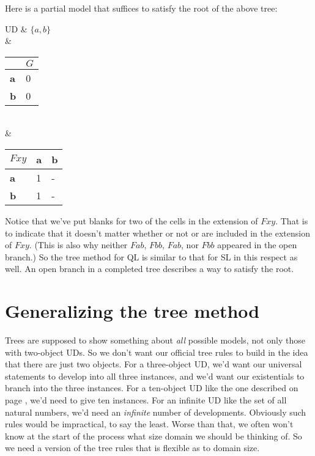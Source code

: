 Here is a partial model that suffices to satisfy the root of the above tree:

\begin{partialmodel}
	UD & $\{a, b\}$\\
	 & \begin{tabular}{l|l}
	           & $G$ \\ \hline
		\textbf{a} & 0          \\
		\textbf{b} & 0         
		\end{tabular}\\
	 & \begin{tabular}{l|ll} $Fxy$        & \textbf{a} & \textbf{b} \\ \hline
		\textbf{a} & 1          & -  \\
		\textbf{b} & 1          &  -
		\end{tabular}

\end{partialmodel}

Notice that we've put blanks for two of the cells in the extension of $Fxy$. That is to indicate that it doesn't matter whether or not  or  are included in the extension of $Fxy$. (This is also why neither $Fab$, $Fbb$, \enot $Fab$, nor \enot $Fbb$ appeared in the open branch.) So the tree method for QL is similar to that for SL in this respect as well. An open branch in a completed tree describes a way to satisfy the root.

\section{Generalizing the tree method}

Trees are supposed to show something about \emph{all} possible models, not only those with two-object UDs. So we don't want our official tree rules to build in the idea that there are just two objects. For a three-object UD, we'd want our universal statements to develop into all three instances, and we'd want our existentials to branch into the three instances. For a ten-object UD like the one described on page \pageref{10UD}, we'd need to give ten instances. For an infinite UD like the set of all natural numbers, we'd need an \emph{infinite} number of developments. Obviously such rules would be impractical, to say the least. Worse than that, we often won't know at the start of the process what size domain we should be thinking of. So we need a version of the tree rules that is flexible as to domain size.

